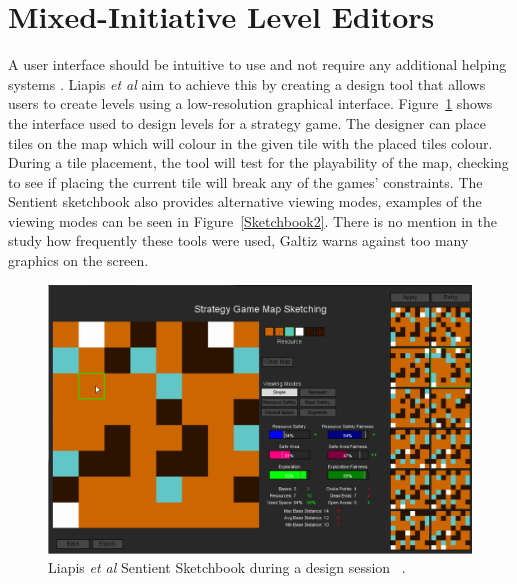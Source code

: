 \documentclass[journal]{IEEEtran}
\begin{document}
\section{Mixed-Initiative Level Editors } \label{UI}
A user interface should be intuitive to use and not require any additional helping systems \cite{oppermann2002user}. Liapis \textit{et al} \cite{liapis2013sentient} aim to achieve this by creating a design tool that allows users to create levels using a low-resolution graphical interface. Figure~\ref{Sketchbook} shows the interface used to design levels for a strategy game. The designer can place tiles on the map which will colour in the given tile with the placed tiles colour. During a tile placement, the tool will test for the playability of the map, checking to see if placing the current tile will break any of the games' constraints. The Sentient sketchbook also provides alternative viewing modes, examples of the viewing modes can be seen in Figure~\ref{Sketchbook2}. There is no mention in the study how frequently these tools were used, Galtiz \cite[p.~752]{galitz2007essential} warns against too many graphics on the screen.

\begin{figure}[h]
	\includegraphics[width=1.0\linewidth]{SentientSketchbook.PNG}
	\caption{Liapis \textit{et al} Sentient Sketchbook during a design session ~\cite{liapis2013sentient}.}
	\label{Sketchbook}
\end{figure} 
\end{document}
